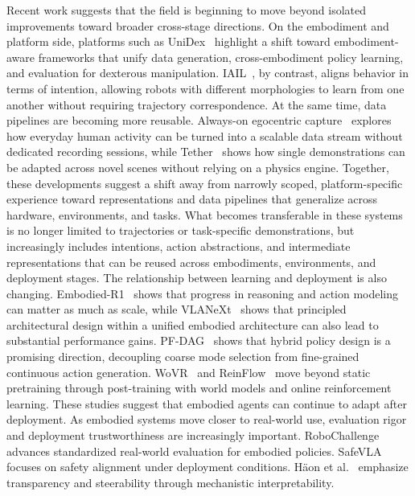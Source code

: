 \documentclass[acmsmall,screen,review]{acmart}
\begin{document}
Recent work suggests that the field is beginning to move beyond isolated improvements toward broader cross-stage directions. 
On the embodiment and platform side, platforms such as UniDex~\cite{zhang2026unidex} highlight a shift toward embodiment-aware frameworks that unify data generation, cross-embodiment policy learning, and evaluation for dexterous manipulation.
IAIL~\cite{chen2026iail}, by contrast, aligns behavior in terms of intention, allowing robots with different morphologies to learn from one another without requiring trajectory correspondence.
At the same time, data pipelines are becoming more reusable. 
Always-on egocentric capture~\cite{yang2026aoe} explores how everyday human activity can be turned into a scalable data stream without dedicated recording sessions, 
while Tether~\cite{liang2026tether} shows how single demonstrations can be adapted across novel scenes without relying on a physics engine. 
Together, these developments suggest a shift away from narrowly scoped, platform-specific experience toward representations and data pipelines that generalize across hardware, environments, and tasks.
What becomes transferable in these systems is no longer limited to trajectories or task-specific demonstrations, but increasingly includes intentions, action abstractions, and intermediate representations that can be reused across embodiments, environments, and deployment stages.
The relationship between learning and deployment is also changing. 
Embodied-R1~\cite{liu2025embodiedr1} shows that progress in reasoning and action modeling can matter as much as scale, 
while VLANeXt~\cite{chen2026vlanext} shows that principled architectural design within a unified embodied architecture can also lead to substantial performance gains.
PF-DAG~\cite{lei2026pfdag} shows that hybrid policy design is a promising direction, decoupling coarse mode selection from fine-grained continuous action generation.
WoVR~\cite{huang2026wovr} and ReinFlow~\cite{yuan2025reinflow} move beyond static pretraining through post-training with world models and online reinforcement learning. 
These studies suggest that embodied agents can continue to adapt after deployment.
As embodied systems move closer to real-world use, evaluation rigor and deployment trustworthiness are increasingly important.
RoboChallenge~\cite{wang2025robochallenge} advances standardized real-world evaluation for embodied policies. 
SafeVLA~\cite{zhang2025safevla} focuses on safety alignment under deployment conditions. 
H\"{a}on et al.~\cite{haon2025mechinterp} emphasize transparency and steerability through mechanistic interpretability.
\end{document}
